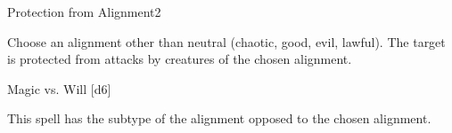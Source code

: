\begin{spellsection}{Protection from Alignment}{2}
    \begin{spellheader}
    \end{spellheader}
    \begin{spellcontent}
        \begin{spelltargetinginfo}
        \end{spelltargetinginfo}
        \begin{spelleffects}
            \spellspecial Choose an alignment other than neutral (chaotic, good, evil, lawful).
            \spelleffect The target is protected from attacks by creatures of the chosen alignment.
            \spelldur \durshort \dismissable
        \end{spelleffects}
    \end{spellcontent}
    \begin{spellsubcontent}
        \begin{spelltargetinginfo}
        \end{spelltargetinginfo}
        \begin{spelleffects}
            \begin{spellattack}{Magic vs. Will}
                \spellsuccess {}[d6]
            \end{spellattack}
        \end{spelleffects}
    \end{spellsubcontent}
    \begin{spellfooter}
        \spellnotes This spell has the subtype of the alignment opposed to the chosen alignment.
        \miscastrandom
    \end{spellfooter}
\end{spellsection}


